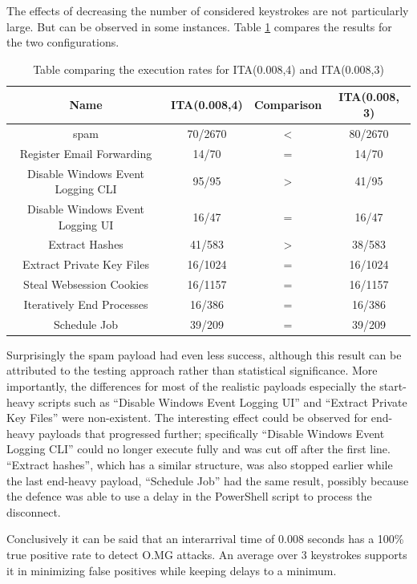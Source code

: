 The effects of decreasing the number of considered keystrokes are not particularly large. But can be observed in some instances. Table \ref{table:ITA_vs_ITA} compares the results for the two configurations. 

\begin{table}[h]
\centering
\begin{tabular}{|c|c|c|c|}
\hline
Name & ITA(0.008,4) & Comparison & ITA(0.008, 3) \\
\hline
spam & 70/2670 & < & 80/2670 \\
\hline
Register Email Forwarding & 14/70 & = &  14/70 \\
\hline
Disable Windows Event Logging CLI & 95/95 & > & 41/95 \\
\hline
Disable Windows Event Logging UI & 16/47 & = &  16/47 \\ 
\hline
Extract Hashes & 41/583 & > &  38/583 \\
\hline
Extract Private Key Files &  16/1024 & = &  16/1024 \\
\hline
Steal Websession Cookies &  16/1157 & = & 16/1157 \\
\hline
Iteratively End Processes & 16/386 & = & 16/386 \\
\hline
Schedule Job & 39/209 & = & 39/209 \\
\hline
\end{tabular}
\caption{Table comparing the execution rates for ITA(0.008,4) and ITA(0.008,3)}
\label{table:ITA_vs_ITA}
\end{table}


Surprisingly the spam payload had even less success, although this result can be attributed to the testing approach rather than statistical significance. More importantly, the differences for most of the realistic payloads especially the start-heavy scripts such as ``Disable Windows Event Logging UI'' and ``Extract Private Key Files'' were non-existent. The interesting effect could be observed for end-heavy payloads that progressed further; specifically ``Disable Windows Event Logging CLI'' could no longer execute fully and was cut off after the first line. ``Extract hashes'', which has a similar structure, was also stopped earlier while the last end-heavy payload, ``Schedule Job'' had the same result, possibly because the defence was able to use a delay in the PowerShell script to process the disconnect.  


Conclusively it can be said that an interarrival time of 0.008 seconds has a 100\% true positive rate to detect O.MG attacks. An average over 3 keystrokes supports it in minimizing false positives while keeping delays to a minimum.




